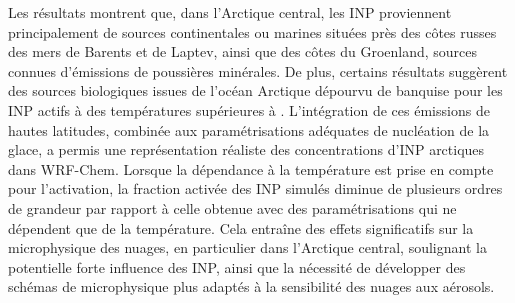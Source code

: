 {Les résultats montrent que, dans l’Arctique central, les INP proviennent principalement de sources continentales ou marines situées près des côtes russes des mers de Barents et de Laptev, ainsi que des côtes du Groenland, sources connues d'émissions de poussières minérales.  
De plus, certains résultats suggèrent des sources biologiques issues de l’océan Arctique dépourvu de banquise pour les INP actifs à des températures supérieures à .  
L’intégration de ces émissions de hautes latitudes, combinée aux paramétrisations adéquates de nucléation de la glace, a permis une représentation réaliste des concentrations d'INP arctiques dans WRF-Chem.  
Lorsque la dépendance à la température est prise en compte pour l'activation, la fraction activée des INP simulés diminue de plusieurs ordres de grandeur par rapport à celle obtenue avec des paramétrisations qui ne dépendent que de la température.  
Cela entraîne des effets significatifs sur la microphysique des nuages, en particulier dans l’Arctique central, soulignant la potentielle forte influence des INP, ainsi que la nécessité de développer des schémas de microphysique plus adaptés à la sensibilité des nuages aux aérosols.
}

